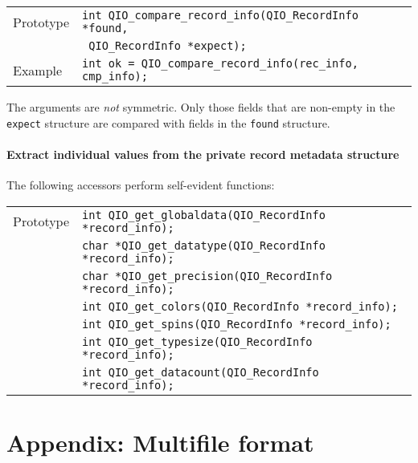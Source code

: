 \documentclass{article}
\begin{document}
%
\begin{flushleft}
  \begin{tabular}{|l|l|}
  \hline
  Prototype      & \verb|int QIO_compare_record_info(QIO_RecordInfo *found,|\\
                 & \verb| QIO_RecordInfo *expect);| \\
\hline
  Example  & \verb|int ok = QIO_compare_record_info(rec_info, cmp_info);|\\
   \hline
 \end{tabular}
\end{flushleft}
%
The arguments are {\it not} symmetric.  Only those fields that are
non-empty in the \verb|expect| structure are compared with fields in
the \verb|found| structure.

\paragraph{Extract individual values from the private record metadata structure}
The following accessors perform self-evident functions:

%
\begin{flushleft}
  \begin{tabular}{|l|l|}
  \hline
  Prototype      & \verb|int QIO_get_globaldata(QIO_RecordInfo *record_info);| \\
                 & \verb|char *QIO_get_datatype(QIO_RecordInfo *record_info);| \\
                 & \verb|char *QIO_get_precision(QIO_RecordInfo *record_info);| \\
                 & \verb|int QIO_get_colors(QIO_RecordInfo *record_info);| \\
                 & \verb|int QIO_get_spins(QIO_RecordInfo *record_info);| \\
                 & \verb|int QIO_get_typesize(QIO_RecordInfo *record_info);| \\
                 & \verb|int QIO_get_datacount(QIO_RecordInfo *record_info);| \\
\hline
 \end{tabular}
\end{flushleft}
%




 

\section{Appendix: Multifile format}
\end{document}
